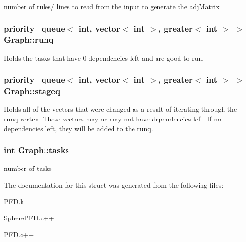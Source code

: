 number of rules/ lines to read from the input to generate the adj\+Matrix 

\hypertarget{structGraph_af6491f1c520f1cbff611984f0da0167a}{
\subsubsection[{runq}]{\setlength{\rightskip}{0pt plus 5cm}priority\+\_\+queue$<$ int, vector$<$ int $>$, greater$<$ int $>$ $>$ Graph\+::runq}}\label{structGraph_af6491f1c520f1cbff611984f0da0167a}


Holds the tasks that have 0 dependencies left and are good to run. 

\hypertarget{structGraph_a8e75929d511a2d1808f89b7a899c6f12}{
\subsubsection[{stageq}]{\setlength{\rightskip}{0pt plus 5cm}priority\+\_\+queue$<$ int, vector$<$ int $>$, greater$<$ int $>$ $>$ Graph\+::stageq}}\label{structGraph_a8e75929d511a2d1808f89b7a899c6f12}


Holds all of the vectors that were changed as a result of iterating through the runq vertex. These vectors may or may not have dependencies left. If no dependencies left, they will be added to the runq. 

\hypertarget{structGraph_a4d2a4b0944a121f0415137f0f1538e4a}{
\subsubsection[{tasks}]{\setlength{\rightskip}{0pt plus 5cm}int Graph\+::tasks}}\label{structGraph_a4d2a4b0944a121f0415137f0f1538e4a}


number of tasks 



The documentation for this struct was generated from the following files\+:\begin{DoxyCompactItemize}
\item 
\hyperlink{PFD_8h}{P\+F\+D.\+h}\item 
\hyperlink{SpherePFD_8c_09_09}{Sphere\+P\+F\+D.\+c++}\item 
\hyperlink{PFD_8c_09_09}{P\+F\+D.\+c++}\end{DoxyCompactItemize}
